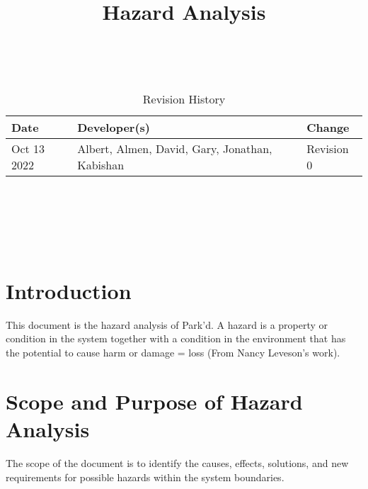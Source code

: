 \documentclass[12pt,letterpaper]{article}
\title{Hazard Analysis\\\progname}
\author{\authname}
\date{}
\begin{document}
\maketitle
\thispagestyle{empty}

~\newpage


\begin{table}[hp]
\caption{Revision History} \label{TblRevisionHistory}
\begin{tabularx}{\textwidth}{lll}
\toprule
\textbf{Date} & \textbf{Developer(s)} & \textbf{Change}\\
\midrule
Oct 13 2022 & Albert, Almen, David, Gary, Jonathan, Kabishan & Revision 0\\
\bottomrule
\end{tabularx}
\end{table}

~\newpage

\tableofcontents

~\newpage

\listoftables

~\newpage


\section{Introduction}

This document is the hazard analysis of Park'd. A hazard is a property or
condition in the system together with a condition in the environment that has
the potential to cause harm or damage = loss (From Nancy Leveson's work).

\section{Scope and Purpose of Hazard Analysis}
The scope of the document is to identify the causes, effects, solutions, and new
requirements for possible hazards within the system boundaries.
\end{document}
